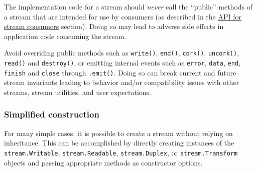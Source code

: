 The implementation code for a stream should \emph{never} call the
``public'' methods of a stream that are intended for use by consumers
(as described in the \hyperref[api-for-stream-consumers]{API for stream
consumers} section). Doing so may lead to adverse side effects in
application code consuming the stream.

Avoid overriding public methods such as \texttt{write()},
\texttt{end()}, \texttt{cork()}, \texttt{uncork()}, \texttt{read()} and
\texttt{destroy()}, or emitting internal events such as
\texttt{\textquotesingle{}error\textquotesingle{}},
\texttt{\textquotesingle{}data\textquotesingle{}},
\texttt{\textquotesingle{}end\textquotesingle{}},
\texttt{\textquotesingle{}finish\textquotesingle{}} and
\texttt{\textquotesingle{}close\textquotesingle{}} through
\texttt{.emit()}. Doing so can break current and future stream
invariants leading to behavior and/or compatibility issues with other
streams, stream utilities, and user expectations.

\subsubsection{Simplified construction}\label{simplified-construction}

For many simple cases, it is possible to create a stream without relying
on inheritance. This can be accomplished by directly creating instances
of the \texttt{stream.Writable}, \texttt{stream.Readable},
\texttt{stream.Duplex}, or \texttt{stream.Transform} objects and passing
appropriate methods as constructor options.

\begin{Shaded}
\begin{Highlighting}[]
\OperatorTok{=} \NormalTok{(}\NormalTok{)}\OperatorTok{;}

\OperatorTok{=}  \NormalTok{(\{}
\NormalTok{  \}}\OperatorTok{,}
  \OperatorTok{,}\OperatorTok{,}
\NormalTok{  \}}\OperatorTok{,}
  \NormalTok{() \{}
\NormalTok{  \}}\OperatorTok{,}
\NormalTok{\})}\OperatorTok{;}
\end{Highlighting}
\end{Shaded}

